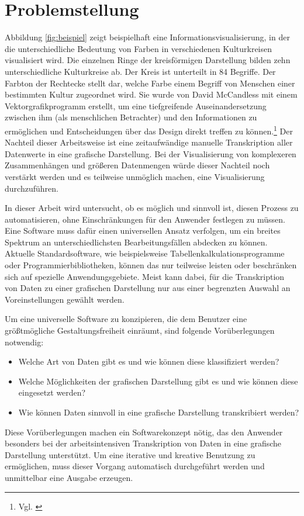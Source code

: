\documentclass[a4paper, 
               12pt,
               DIV=calc,
               version=first,
               pdftex,
               headsepline,
               footsepline,
               bibliography=totocnumbered,
               listof=numbered]{scrreprt}
\begin{document}
\section{Problemstellung}
Abbildung \ref{fig:beispiel} zeigt beispielhaft eine Informationsvisualisierung, in der die
unterschiedliche Bedeutung von Farben in verschiedenen
Kulturkreisen visualisiert wird. Die einzelnen Ringe der kreisförmigen Darstellung bilden zehn
unterschiedliche Kulturkreise ab. Der Kreis ist unterteilt in 84 Begriffe.
Der Farbton der Rechtecke stellt dar, welche Farbe einem Begriff von Menschen einer bestimmten Kultur zugeordnet wird.
Sie wurde von David McCandless mit einem Vektorgrafikprogramm erstellt, um
eine tiefgreifende Auseinandersetzung zwischen ihm (als menschlichen Betrachter) und den Informationen
zu ermöglichen und Entscheidungen über das Design direkt treffen zu können.\footnote{Vgl. \citep{infoblog}} Der Nachteil dieser
Arbeitsweise ist eine zeitaufwändige manuelle Transkription aller Datenwerte in eine grafische
Darstellung. Bei der Visualisierung von komplexeren Zusammenhängen und größeren Datenmengen würde dieser 
Nachteil noch verstärkt werden und es teilweise unmöglich machen, eine Visualisierung durchzuführen.

In dieser Arbeit wird untersucht, ob es möglich und sinnvoll ist, diesen Prozess  zu automatisieren,
ohne Einschränkungen für den Anwender festlegen zu müssen.
Eine Software muss dafür einen universellen Ansatz verfolgen, um ein breites Spektrum an
unterschiedlichsten Bearbeitungsfällen abdecken zu können. 
Aktuelle Standardsoftware, wie beispielsweise Tabellenkalkulationsprogramme oder Programmierbibliotheken,
können das nur teilweise leisten oder beschränken sich auf spezielle Anwendungsgebiete.
Meist kann dabei, für die Transkription von Daten zu einer grafischen Darstellung nur
aus einer begrenzten Auswahl an Voreinstellungen gewählt werden.

Um eine universelle Software zu konzipieren, die dem Benutzer eine größtmögliche
Gestaltungsfreiheit einräumt, sind folgende Vorüberlegungen notwendig:
\begin{itemize}
\item{Welche Art von Daten gibt es und wie können diese klassifiziert werden?}
\item{Welche Möglichkeiten der grafischen Darstellung gibt es und wie können diese eingesetzt werden?}
\item{Wie können Daten sinnvoll in eine grafische Darstellung transkribiert werden?}
\end{itemize}
Diese Vorüberlegungen machen ein Softwarekonzept nötig, das den Anwender besonders bei der 
arbeitsintensiven Transkription
von Daten in eine grafische Darstellung unterstützt.
Um eine iterative und kreative Benutzung zu ermöglichen, muss dieser Vorgang
automatisch durchgeführt werden und unmittelbar eine Ausgabe erzeugen.
\end{document}
